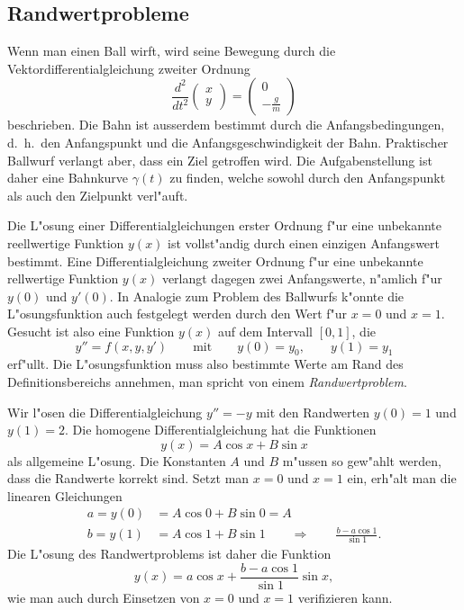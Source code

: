 \subsection{Randwertprobleme\label{section:randwertprobleme}}
Wenn man einen Ball wirft, wird seine Bewegung durch die
Vektordifferentialgleichung zweiter Ordnung
\[
\frac{d^2}{dt^2}\begin{pmatrix}x\\y\end{pmatrix}
=
\begin{pmatrix}0\\\displaystyle-\frac{g}{m}\end{pmatrix}
\]
beschrieben.
Die Bahn ist ausserdem bestimmt durch die Anfangsbedingungen,
d.~h.~den Anfangspunkt und die Anfangsgeschwindigkeit der Bahn.
Praktischer Ballwurf verlangt aber, dass ein Ziel getroffen wird.
Die Aufgabenstellung ist daher eine Bahnkurve $\gamma(t)$ zu finden,
welche sowohl durch den Anfangspunkt als auch den Zielpunkt
verl"auft.

Die L"osung einer Differentialgleichungen erster Ordnung f"ur eine
unbekannte reellwertige Funktion $y(x)$ ist vollst"andig durch einen
einzigen Anfangswert bestimmt.
Eine Differentialgleichung zweiter Ordnung f"ur eine unbekannte
rellwertige Funktion $y(x)$ verlangt dagegen zwei Anfangswerte,
n"amlich f"ur $y(0)$ und $y'(0)$.
In Analogie zum Problem des Ballwurfs k"onnte die L"osungsfunktion auch
festgelegt werden durch den Wert f"ur $x=0$ und $x=1$.
Gesucht ist also eine Funktion $y(x)$ auf dem Intervall $[0,1]$, die
\begin{equation}
y''=f(x,y,y')
\qquad\text{mit}\qquad
y(0)=y_0,
\qquad
y(1)=y_1
\end{equation}
erf"ullt.
Die L"osungsfunktion muss also bestimmte Werte am Rand des Definitionsbereichs
annehmen, man spricht von einem {\em Randwertproblem}.
%

\begin{beispiel}
Wir l"osen die Differentialgleichung $y''=-y$ mit den Randwerten
$y(0)=1$ und $y(1)=2$.
Die homogene Differentialgleichung hat die Funktionen
\[
y(x)=A \cos x + B\sin x
\]
als allgemeine L"osung.
Die Konstanten $A$ und $B$ m"ussen so gew"ahlt werden, dass die Randwerte
korrekt sind.
Setzt man $x=0$ und $x=1$ ein, erh"alt man die linearen Gleichungen
\begin{align*}
a=y(0)&=A\cos 0 + B\sin 0=A\\
b=y(1)&=A\cos 1 + B\sin 1
\qquad\Rightarrow\qquad
\frac{b-a\cos 1}{\sin 1}.
\end{align*}
Die L"osung des Randwertproblems ist daher die Funktion
\[
y(x)=a\cos x +\frac{b-a\cos 1}{\sin 1}\sin x,
\]
wie man auch durch Einsetzen von $x=0$ und $x=1$ verifizieren kann.
\end{beispiel}

